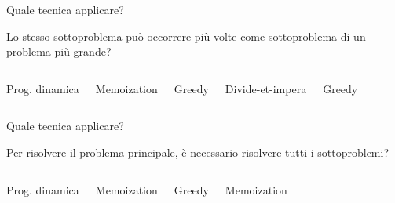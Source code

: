 \begin{frame}{Quale tecnica applicare?}

\vspace{-9pt}
\begin{myboxtitle}[Ripetizioni]
Lo stesso sottoproblema può occorrere più volte come sottoproblema di un problema più grande?
\end{myboxtitle}

\vspace{-9pt}
\begin{columns}[T]
\BIL
\item Prog. dinamica
\item Memoization
\item Greedy
\EIL
{}
\BIL
\item Divide-et-impera
\item Greedy
\EIL
\end{columns}

\end{frame}

\begin{frame}{Quale tecnica applicare?}

\vspace{-9pt}
\begin{myboxtitle}
\BIL
\item Per risolvere il problema principale, è necessario risolvere tutti i sottoproblemi?
\EIL
\end{myboxtitle}

\vspace{-9pt}
\begin{columns}[T]
\BIL
\item Prog. dinamica
\item Memoization
\EIL
{}
\BIL
\item Greedy
\item Memoization
\EIL
\end{columns}

\end{frame}






